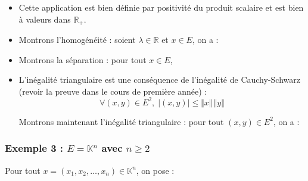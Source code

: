 \documentclass[french,11pt,twoside]{VcCours}
\begin{document}
\begin{itemize}
\item Cette application est bien définie par positivité du produit scalaire et est bien à valeurs dans $\mathbb{R}_+$.
\item Montrons l'homogénéité  : soient $\lambda \in \mathbb{R}$ et $x \in E$, on a :

\vspace*{2cm}
\item Montrons la séparation : pour tout $x \in E$, 

\vspace*{2cm}
\item L'inégalité triangulaire est une conséquence de l'inégalité de Cauchy-Schwarz (revoir la preuve dans le cours de première année) :
$$ \forall (x,y) \in E^2, \; \vert (x,y) \vert \leq \Vert x \Vert \, \Vert y \Vert$$


Montrons maintenant l'inégalité triangulaire : pour tout $(x,y) \in E^2$, on a :
 
\vspace*{6cm}


\end{itemize}

\subsubsection{Exemple 3 : \texorpdfstring{$E= \mathbb{K}^n$ avec $n \geq 2$}{E=IKⁿ avec n≥2}}

Pour tout $x=(x_1, x_2, \ldots, x_n) \in \mathbb{K}^n$, on pose :
\end{document}
